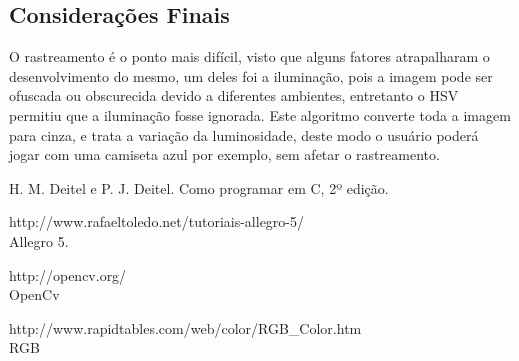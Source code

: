 \documentclass{sciposter}
\begin{document}
\begin{multicols}{3}
\section{Considerações Finais}

O rastreamento é o ponto mais difícil, visto que alguns fatores atrapalharam o desenvolvimento do mesmo, um deles foi a iluminação, pois a imagem pode ser ofuscada ou obscurecida devido a diferentes ambientes, entretanto o HSV permitiu que a iluminação fosse ignorada. Este algoritmo converte toda a imagem para cinza, e trata a variação da luminosidade, deste modo o usuário poderá jogar com uma camiseta azul por exemplo, sem afetar o rastreamento.



\begin{thebibliography}{5}

H. M. Deitel e P. J. Deitel.
\newblock Como programar em C, 2º edição.

 http://www.rafaeltoledo.net/tutoriais-allegro-5/
\\
\newblock Allegro 5.

 http://opencv.org/
\\
\newblock OpenCv

 http://www.rapidtables.com/web/color/RGB\_Color.htm \\
\newblock RGB

\end{thebibliography}

\end{multicols}
\end{document}
